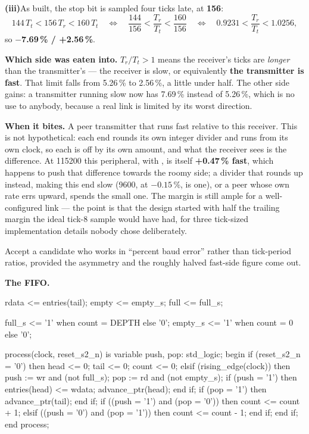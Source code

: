 \medskip\noindent\textbf{(iii)}\enspace As built, the stop bit is sampled four ticks late, at
\textbf{156}:
\[
  144\,T_t < 156\,T_r < 160\,T_t
  \quad\Longleftrightarrow\quad
  \frac{144}{156} < \frac{T_r}{T_t} < \frac{160}{156}
  \quad\Longleftrightarrow\quad
  0.9231 < \frac{T_r}{T_t} < 1.0256,
\]
so \textbf{$-$7.69\,\% / +2.56\,\%}. 

\textbf{Which side was eaten into.} $T_r / T_t > 1$ means the receiver's ticks are \emph{longer}
than the transmitter's --- the receiver is slow, or equivalently \textbf{the transmitter is fast}.
That limit falls from 5.26\,\% to 2.56\,\%, a little under half. The other side gains: a transmitter
running slow now has 7.69\,\% instead of 5.26\,\%, which is no use to anybody, because a real link is
limited by its worst direction.

\textbf{When it bites.} A peer transmitter that runs fast relative to this receiver. This is not
hypothetical: each end rounds its own integer divider and runs from its own clock, so each is off by
its own amount, and what the receiver sees is the difference. At 115200 this peripheral, with
, is itself \textbf{+0.47\,\% fast}, which happens to push that difference
towards the roomy side; a divider that rounds up instead, making this end slow (9600, at
$-0.15$\,\%, is one), or a peer whose own rate errs upward, spends the small one. The margin is
still ample for a well-configured link --- the point is that the design started with half the
trailing margin the ideal tick-8 sample would have had, for three tick-sized implementation details
nobody chose deliberately. 

Accept a candidate who works in ``percent baud error'' rather than tick-period ratios, provided the
asymmetry and the roughly halved fast-side figure come out.

\textbf{The FIFO.}

\begin{vhdlcode}
    rdata <= entries(tail);
    empty <= empty_s;
    full  <= full_s;

    full_s  <= '1' when count = DEPTH else '0';
    empty_s <= '1' when count = 0 else '0';

    process(clock, reset_s2_n) is
    variable push, pop: std_logic;
    begin
        if (reset_s2_n = '0') then
            head  <= 0;
            tail  <= 0;
            count <= 0;
        elsif (rising_edge(clock)) then
            push := wr and (not full_s);
            pop  := rd and (not empty_s);
            if (push = '1') then
                entries(head) <= wdata;
                advance_ptr(head);
            end if;
            if (pop = '1') then
                advance_ptr(tail);
            end if;
            if ((push = '1') and (pop = '0')) then
                count <= count + 1;
            elsif ((push = '0') and (pop = '1')) then
                count <= count - 1;
            end if;
        end if;
    end process;
\end{vhdlcode}

